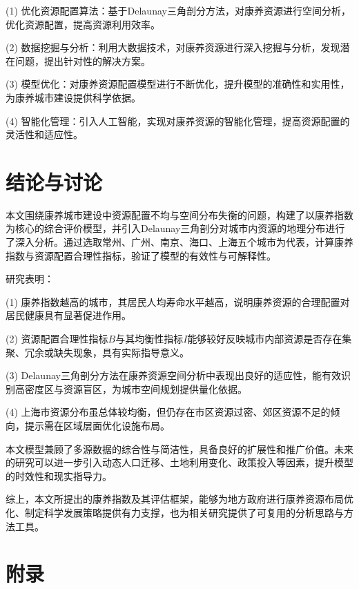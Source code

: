 \documentclass[12pt,a4paper]{article}
\begin{document}
(1) 优化资源配置算法：基于Delaunay三角剖分方法，对康养资源进行空间分析，优化资源配置，提高资源利用效率。

(2) 数据挖掘与分析：利用大数据技术，对康养资源进行深入挖掘与分析，发现潜在问题，提出针对性的解决方案。

(3) 模型优化：对康养资源配置模型进行不断优化，提升模型的准确性和实用性，为康养城市建设提供科学依据。

(4) 智能化管理：引入人工智能，实现对康养资源的智能化管理，提高资源配置的灵活性和适应性。

\newpage

\onecolumn

\section{结论与讨论}

本文围绕康养城市建设中资源配置不均与空间分布失衡的问题，构建了以康养指数为核心的综合评价模型，并引入Delaunay三角剖分对城市内资源的地理分布进行了深入分析。通过选取常州、广州、南京、海口、上海五个城市为代表，计算康养指数与资源配置合理性指标，验证了模型的有效性与可解释性。

研究表明：

(1) 康养指数越高的城市，其居民人均寿命水平越高，说明康养资源的合理配置对居民健康具有显著促进作用。

(2) 资源配置合理性指标$B$与其均衡性指标$I$能够较好反映城市内部资源是否存在集聚、冗余或缺失现象，具有实际指导意义。

(3) Delaunay三角剖分方法在康养资源空间分析中表现出良好的适应性，能有效识别高密度区与资源盲区，为城市空间规划提供量化依据。

(4) 上海市资源分布虽总体较均衡，但仍存在市区资源过密、郊区资源不足的倾向，提示需在区域层面优化设施布局。

本文模型兼顾了多源数据的综合性与简洁性，具备良好的扩展性和推广价值。未来的研究可以进一步引入动态人口迁移、土地利用变化、政策投入等因素，提升模型的时效性和现实指导力。

综上，本文所提出的康养指数及其评估框架，能够为地方政府进行康养资源布局优化、制定科学发展策略提供有力支撑，也为相关研究提供了可复用的分析思路与方法工具。


\onecolumn
\newpage
\section*{附录}
\end{document}
